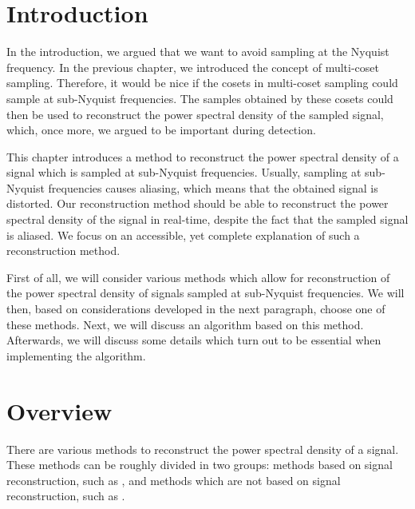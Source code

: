 \documentclass[a4paper, openany, oneside]{memoir}
\begin{document}

\section{Introduction}
In the introduction, we argued that we want to avoid sampling at the Nyquist frequency. In the previous chapter, we introduced the concept of multi-coset sampling. Therefore, it would be nice if the cosets in multi-coset sampling could sample at sub-Nyquist frequencies. The samples obtained by these cosets could then be used to reconstruct the power spectral density of the sampled signal, which, once more, we argued to be important during detection.

This chapter introduces a method to reconstruct the power spectral density of a signal which is sampled at sub-Nyquist frequencies. Usually, sampling at sub-Nyquist frequencies causes aliasing, which means that the obtained signal is distorted. Our reconstruction method should be able to reconstruct the power spectral density of the signal in real-time, despite the fact that the sampled signal is aliased. We focus on an accessible, yet complete explanation of such a reconstruction method.

First of all, we will consider various methods which allow for reconstruction of the power spectral density of signals sampled at sub-Nyquist frequencies. We will then, based on considerations developed in the next paragraph, choose one of these methods. Next, we will discuss an algorithm based on this method. Afterwards, we will discuss some details which turn out to be essential when implementing the algorithm.


\section{Overview}
There are various methods to reconstruct the power spectral density of a signal. These methods can be roughly divided in two groups: methods based on signal reconstruction, such as \cite{bayarkernel, candes2006robust, candes2007sparsity, candes2008introduction, kirolos2006analog, li2014gomp, polo2009compressive, pal2011coprime}, and methods which are not based on signal reconstruction, such as \cite{ariananda2011multicoset,ariananda2012compressive}.
\end{document}
